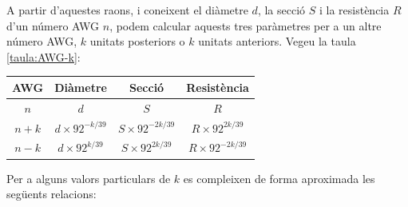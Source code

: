 A partir d'aquestes raons, i coneixent el diàmetre $d$, la secció $S$ i la resistència $R$ d'un número AWG $n$, podem calcular aquests tres paràmetres per a un altre número AWG, $k$ unitats posteriors o $k$ unitats anteriors. Vegeu la taula \vref{taula:AWG-k}:


\begin{center}
	\label{taula:AWG-k}
	\begin{tabular}{cccc}
		\toprule[1pt]
		AWG & Diàmetre & Secció & Resistència
		\\
		\midrule
		$n$ & $d$ & $S$ & $R$ \\
		$n+k$   & $d\times92^{-k/39}$ & $S\times92^{-2k/39}$ & $R\times92^{2k/39}$ \\
		$n-k$   & $d\times92^{k/39}$ & $S\times92^{2k/39}$ & $R\times92^{-2k/39}$ \\
		\bottomrule[1pt]
	\end{tabular}
\end{center}

Per a alguns valors particulars de $k$ es compleixen de forma aproximada les següents relacions:

